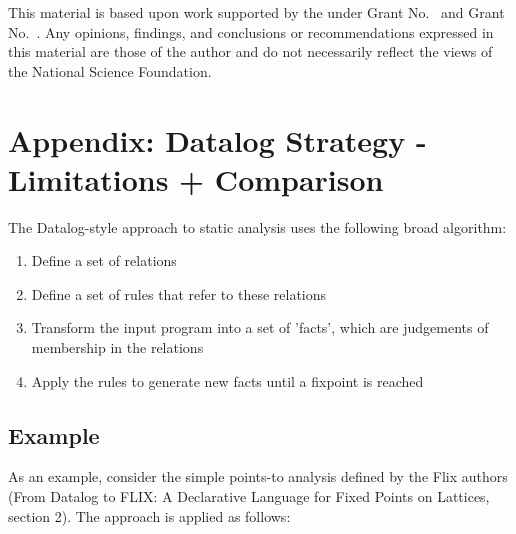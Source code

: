 \documentclass[acmlarge,anonymous]{acmart}\settopmatter{printfolios=true}
\begin{document}
\begin{acks}                            %
  This material is based upon work supported by the
   under Grant
  No.~ and Grant
  No.~.  Any opinions, findings, and
  conclusions or recommendations expressed in this material are those
  of the author and do not necessarily reflect the views of the
  National Science Foundation.
\end{acks}


%

\newpage
\appendix
\section{Appendix: Datalog Strategy - Limitations + Comparison}

The Datalog-style approach to static analysis uses the following broad algorithm:

\begin{enumerate}
    \item Define a set of relations
    \item Define a set of rules that refer to these relations
    \item Transform the input program into a set of 'facts', which are judgements of membership in the relations
    \item Apply the rules to generate new facts until a fixpoint is reached
\end{enumerate}

\subsection{Example}

As an example, consider the simple points-to analysis defined by the Flix authors (From Datalog to FLIX: A Declarative Language for Fixed Points on Lattices, section 2). The approach is applied as follows:
\end{document}
